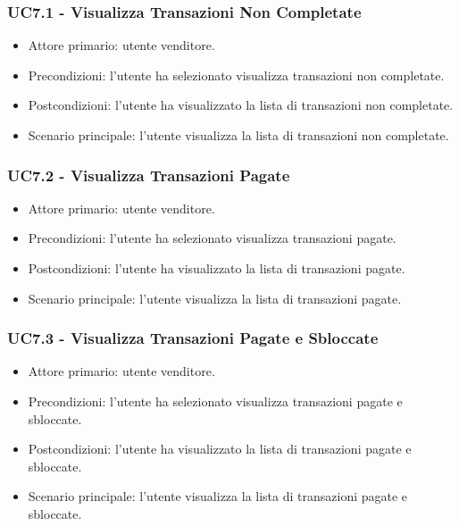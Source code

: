 \subsubsection{UC7.1 - Visualizza Transazioni Non Completate}

\begin{itemize}
    \item Attore primario: utente venditore.
    \item Precondizioni: l'utente ha selezionato visualizza transazioni non completate.
    \item Postcondizioni: l'utente ha visualizzato la lista di transazioni non completate.
    \item Scenario principale: l'utente visualizza la lista di transazioni non completate.
\end{itemize}

\subsubsection{UC7.2 - Visualizza Transazioni Pagate}

\begin{itemize}
    \item Attore primario: utente venditore.
    \item Precondizioni: l'utente ha selezionato visualizza transazioni pagate.
    \item Postcondizioni: l'utente ha visualizzato la lista di transazioni pagate.
    \item Scenario principale: l'utente visualizza la lista di transazioni pagate.
\end{itemize}

\subsubsection{UC7.3 - Visualizza Transazioni Pagate e Sbloccate}

\begin{itemize}
    \item Attore primario: utente venditore.
    \item Precondizioni: l'utente ha selezionato visualizza transazioni pagate e sbloccate.
    \item Postcondizioni: l'utente ha visualizzato la lista di transazioni pagate e sbloccate.
    \item Scenario principale: l'utente visualizza la lista di transazioni pagate e sbloccate.
\end{itemize}
\clearpage
